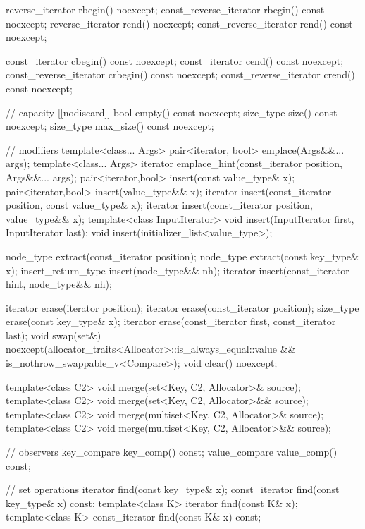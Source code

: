 \begin{codeblock}
{{    reverse_iterator       rbegin() noexcept;
    const_reverse_iterator rbegin() const noexcept;
    reverse_iterator       rend() noexcept;
    const_reverse_iterator rend() const noexcept;

    const_iterator         cbegin() const noexcept;
    const_iterator         cend() const noexcept;
    const_reverse_iterator crbegin() const noexcept;
    const_reverse_iterator crend() const noexcept;

    // capacity
    [[nodiscard]] bool empty() const noexcept;
    size_type size() const noexcept;
    size_type max_size() const noexcept;

    // modifiers
    template<class... Args> pair<iterator, bool> emplace(Args&&... args);
    template<class... Args> iterator emplace_hint(const_iterator position, Args&&... args);
    pair<iterator,bool> insert(const value_type& x);
    pair<iterator,bool> insert(value_type&& x);
    iterator insert(const_iterator position, const value_type& x);
    iterator insert(const_iterator position, value_type&& x);
    template<class InputIterator>
      void insert(InputIterator first, InputIterator last);
    void insert(initializer_list<value_type>);

    node_type extract(const_iterator position);
    node_type extract(const key_type& x);
    insert_return_type insert(node_type&& nh);
    iterator           insert(const_iterator hint, node_type&& nh);

    iterator  erase(iterator position);
    iterator  erase(const_iterator position);
    size_type erase(const key_type& x);
    iterator  erase(const_iterator first, const_iterator last);
    void      swap(set&)
      noexcept(allocator_traits<Allocator>::is_always_equal::value &&
               is_nothrow_swappable_v<Compare>);
    void      clear() noexcept;

    template<class C2>
      void merge(set<Key, C2, Allocator>& source);
    template<class C2>
      void merge(set<Key, C2, Allocator>&& source);
    template<class C2>
      void merge(multiset<Key, C2, Allocator>& source);
    template<class C2>
      void merge(multiset<Key, C2, Allocator>&& source);

    // observers
    key_compare key_comp() const;
    value_compare value_comp() const;

    // set operations
    iterator       find(const key_type& x);
    const_iterator find(const key_type& x) const;
    template<class K> iterator       find(const K& x);
    template<class K> const_iterator find(const K& x) const;

}}
\end{codeblock}
